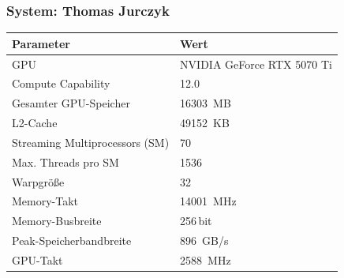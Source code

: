 \subsubsection*{System: Thomas Jurczyk}
\begin{center}
    \small
    \setlength{\tabcolsep}{6pt}
    \renewcommand{\arraystretch}{0.9}
    \begin{tabular}{ll}
        \toprule
        Parameter & Wert \\
        \midrule
        GPU                              & NVIDIA GeForce RTX 5070 Ti \\
        Compute Capability               & 12.0 \\
        Gesamter GPU-Speicher            & \SI{16303}{MB} \\
        L2-Cache                         & \SI{49152}{KB} \\
        Streaming Multiprocessors (SM)   & 70 \\
        Max. Threads pro SM              & 1536 \\
        Warpgröße                        & 32 \\
        Memory-Takt                      & \SI{14001}{MHz} \\
        Memory-Busbreite                 & 256\,bit \\
        Peak-Speicherbandbreite          & \SI{896}{GB/s} \\
        GPU-Takt                         & \SI{2588}{MHz} \\
        \bottomrule
    \end{tabular}
\end{center}
